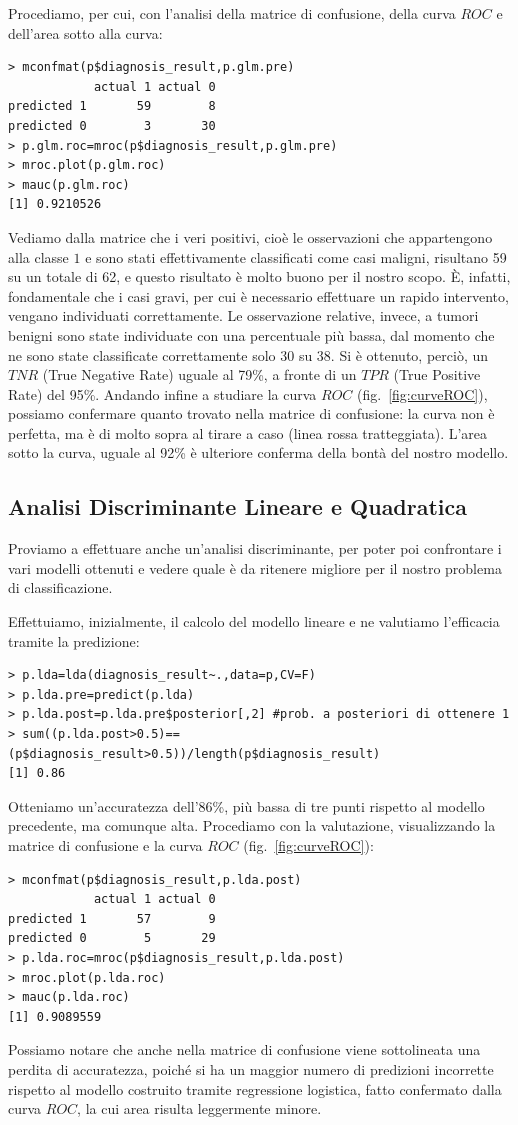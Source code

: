 \documentclass[11pt,a4paper,oneside]{article}
\begin{document}
Procediamo, per cui, con l'analisi della matrice di confusione, della curva $ROC$ e dell'area sotto alla curva:
\begin{verbatim}
> mconfmat(p$diagnosis_result,p.glm.pre)
            actual 1 actual 0
predicted 1       59        8
predicted 0        3       30
> p.glm.roc=mroc(p$diagnosis_result,p.glm.pre)
> mroc.plot(p.glm.roc)
> mauc(p.glm.roc)
[1] 0.9210526
\end{verbatim}
Vediamo dalla matrice che i veri positivi, cioè le osservazioni che appartengono alla classe $1$ e sono stati effettivamente classificati come casi maligni, risultano 59 su un totale di 62, e questo risultato è molto buono per il nostro scopo. È, infatti, fondamentale che i casi gravi, per cui è necessario effettuare un rapido intervento, vengano individuati correttamente. Le osservazione relative, invece, a tumori benigni sono state individuate con una percentuale più bassa, dal momento che ne sono state classificate correttamente solo 30 su 38. Si è ottenuto, perciò, un $TNR$ (True Negative Rate) uguale al 79\%, a fronte di un $TPR$ (True Positive Rate) del 95\%.
Andando infine a studiare la curva $ROC$ (fig.~\vref{fig:curveROC}), possiamo confermare quanto trovato nella matrice di confusione: la curva non è perfetta, ma è di molto sopra al tirare a caso (linea rossa tratteggiata). L'area sotto la curva, uguale al 92\% è ulteriore conferma della bontà del nostro modello.

\subsection{Analisi Discriminante Lineare e Quadratica}
Proviamo a effettuare anche un'analisi discriminante, per poter poi confrontare i vari modelli ottenuti e vedere quale è da ritenere migliore per il nostro problema di classificazione.

Effettuiamo, inizialmente, il calcolo del modello lineare e ne valutiamo l'efficacia tramite la predizione:
\begin{verbatim}
> p.lda=lda(diagnosis_result~.,data=p,CV=F)
> p.lda.pre=predict(p.lda)
> p.lda.post=p.lda.pre$posterior[,2] #prob. a posteriori di ottenere 1
> sum((p.lda.post>0.5)==(p$diagnosis_result>0.5))/length(p$diagnosis_result)
[1] 0.86
\end{verbatim}
Otteniamo un'accuratezza dell'86\%, più bassa di tre punti rispetto al modello precedente, ma comunque alta. Procediamo con la valutazione, visualizzando la matrice di confusione e la curva $ROC$ (fig.~\ref{fig:curveROC}):
\begin{verbatim}
> mconfmat(p$diagnosis_result,p.lda.post)
            actual 1 actual 0
predicted 1       57        9
predicted 0        5       29
> p.lda.roc=mroc(p$diagnosis_result,p.lda.post)
> mroc.plot(p.lda.roc)
> mauc(p.lda.roc)
[1] 0.9089559
\end{verbatim}
Possiamo notare che anche nella matrice di confusione viene sottolineata una perdita di accuratezza, poiché si ha un maggior numero di predizioni incorrette rispetto al modello costruito tramite regressione logistica, fatto confermato dalla curva $ROC$, la cui area risulta leggermente minore.
\end{document}
